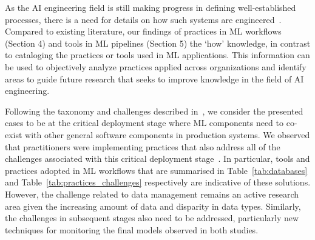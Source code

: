 




As the AI engineering field is still making progress in defining well-established processes, there is a need for details on how such systems are engineered~\cite{9121629}. Compared to existing literature, our findings of practices in ML workflows (Section 4) and tools in ML pipelines (Section 5) \DIFdelbegin {}\DIFdelend \DIFaddbegin {}\DIFaddend the ‘how’ knowledge, in contrast to cataloging the practices or tools used in ML applications. This information can be used to objectively analyze practices applied across organizations and identify areas to guide future research \DIFaddbegin {}\DIFaddend that seeks to improve knowledge in the field of AI engineering.

Following the taxonomy and challenges described in~\cite{Lwakatare2019}, we consider the presented cases to be at the critical deployment stage where ML components need to co-exist with other general software components in production systems. We observed that practitioners were implementing practices that also address all of the challenges associated with this critical deployment stage~\cite{Lwakatare2019}. In particular, tools and practices adopted in ML workflows that are summarised in Table~\ref{tab:databases} and Table~\ref{tab:practices_challenges} respectively are indicative of these solutions. However, the challenge related to data management remains an active research area given the increasing amount of data and disparity in data types. Similarly, the challenges in subsequent stages also need to be addressed, particularly new techniques for monitoring the final models observed in both studies.

